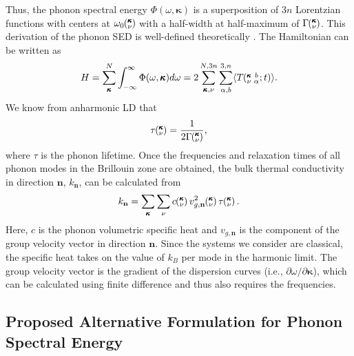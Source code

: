 \documentclass[twocolumn,10pt]{asme2e}
\newcommand{\kvbat}{\mspace{-4.0mu}\left(\mspace{-8.0mu}\begin{smallmatrix} &\pmb{\kappa} &b \\ &\nu &\alpha\end{smallmatrix}\mspace{-2.0mu};t\right)}
\newcommand{\kv}{\mspace{-4.0mu}\left(\mspace{-8.0mu}\begin{smallmatrix}&\pmb{\kappa} \\&\nu\end{smallmatrix}\mspace{-3.0mu}\right)}
\begin{document}
Thus, the phonon spectral energy $\Phi(\omega,\pmb{\kappa})$ is a superposition of $3n$ Lorentzian
functions with centers at $\omega_0\kv$ with a half-width at half-maximum of
$\Gamma\kv$. This derivation of the phonon SED is well-defined theoretically \cite{wallace1972}. The Hamiltonian can be written as
\begin{equation}\label{E:equipartition}
H=\sum_{\pmb{\kappa}}^{N}\int_{-\infty}^{\infty}\Phi(\omega,\pmb{\kappa})d\omega=2\sum_{\pmb{\kappa},\nu}^{N,3n}\sum_{\alpha,b}^{3,n}\langle T\kvbat\rangle.
\end{equation}
We know from anharmonic LD that \cite{maradudin1962,ladd1986}
\begin{equation}\label{E:lifetime}
\tau\kv=\frac{1}{2\Gamma\kv},
\end{equation}
where $\tau$ is the phonon lifetime. Once the frequencies and relaxation times of all phonon modes in the
Brillouin zone are obtained, the bulk thermal conductivity in direction
$\mathbf{n}$, $k_{\mathbf{n}}$, can be calculated from
\begin{equation}
	\label{E-size:k_bulk}
	k_{\mathbf{n}}=\sum_{\pmb{\kappa}} \sum_\nu c \kv v^{2}_{g,\mathbf{n}} \kv \tau \kv.
\end{equation}
Here, $c$ is the phonon volumetric specific heat and ${v}_{g,\mathbf{n}}$ is
the component of the group velocity vector in direction $\mathbf{n}$. Since the systems we consider are classical, the
specific heat takes on the value of $k_B$ per mode in the harmonic limit. The group
velocity vector is the gradient of the dispersion curves (i.e., $\partial
\omega /
\partial \pmb{\kappa}$), which can be calculated using finite difference and thus also requires the frequencies.


\subsection*{Proposed Alternative Formulation for Phonon Spectral Energy}\label{S:Properties}
\end{document}
